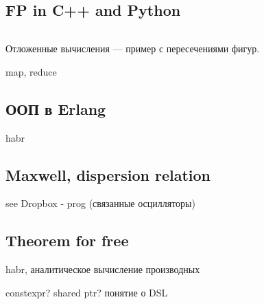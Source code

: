 \documentclass{book}
\begin{document}
\subsection{FP in C++ and Python}

\inputminted{cpp}{whyfpmatters.cpp}

Отложенные вычисления --- пример с пересечениями фигур.

map, reduce

\subsection{ООП в Erlang}

habr

\subsection{Maxwell, dispersion relation}

see Dropbox - prog (связанные осцилляторы)


\subsection{Theorem for free}

habr, аналитическое вычисление производных

constexpr?
shared ptr?
понятие о DSL



\end{document}
